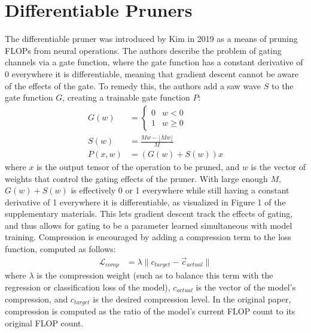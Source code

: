 \documentclass[10pt,twocolumn,letterpaper]{article}
\begin{document}
\section{Differentiable Pruners}
The differentiable pruner was introduced by Kim \etal \cite{kim2019} in 2019 as a means of pruning FLOPs from neural operations. The authors describe the problem of gating channels via a gate function, where the gate function has a constant derivative of 0 everywhere it is differentiable, meaning that gradient descent cannot be aware of the effects of the gate. To remedy this, the authors add a saw wave $S$ to the gate function $G$, creating a trainable gate function $P$:
\begin{align}
	G(w) &= \begin{cases}
						0 & w<0 \\
						1 & w\ge 0
					\end{cases} \\
	S(w) &= \frac{M w - \lfloor M w \rfloor}{M} \\
	P(x, w) &= (G(w) + S(w)) x
\end{align}
where $x$ is the output tensor of the operation to be pruned, and $w$ is the vector of weights that control the gating effects of the pruner. With large enough $M$, $G(w)+S(w)$ is effectively 0 or 1 everywhere while still having a constant derivative of 1 everywhere it is differentiable, as visualized in Figure 1 of the supplementary materials. This lets gradient descent track the effects of gating, and thus allows for gating to be a parameter learned simultaneous with model training. Compression is encouraged by adding a compression term to the loss function, computed as follows:
\begin{align}
	\mathcal{L}_{comp} &= \lambda \lVert c_{target} - \vec{c}_{actual} \rVert \label{eq:comp_term}
\end{align}
where $\lambda$ is the compression weight (such as to balance this term with the regression or classification loss of the model), $c_{actual}$ is the vector of the model's compression, and $c_{target}$ is the desired compression level. In the original paper, compression is computed as the ratio of the model's current FLOP count to its original FLOP count.
\end{document}
